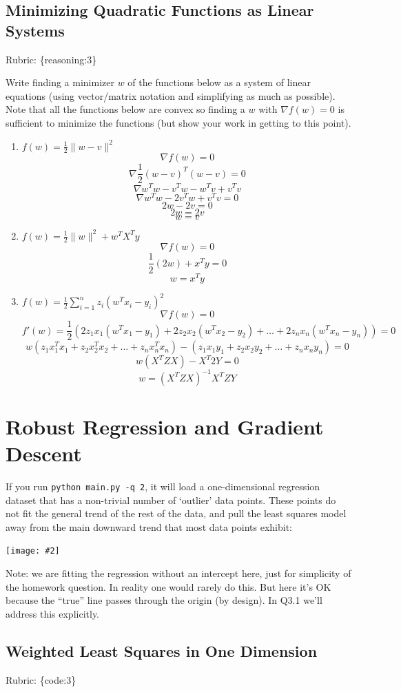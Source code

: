 \documentclass{article}
\def\rubric#1{\gre{Rubric: \{#1\}}}{}
\def\gre#1{{\color{gre}#1}}
\def\norm#1{\|#1\|}
\newcommand{\centerfig}[2]{\begin{center}\texttt{[image: \#2]}\end{center}}
\def\enum#1{\begin{enumerate}#1\end{enumerate}}
\begin{document}
\subsection{Minimizing Quadratic Functions as Linear Systems}
\rubric{reasoning:3}

Write finding a minimizer $w$ of the functions below as a system of linear equations (using vector/matrix notation and simplifying as much as possible). Note that all the functions below are convex  so finding a $w$ with $\nabla f(w) = 0$ is sufficient to minimize the functions (but show your work in getting to this point).
{\enum{
\item $f(w) = \frac{1}{2}\norm{w-v}^2$
$$\nabla f(w) = 0$$
$$\nabla \frac{1}{2}(w-v)^T(w-v) = 0$$
$$\nabla w^Tw - v^Tw - w^Tv + v^Tv$$
$$\nabla w^Tw - 2v^Tw + v^Tv = 0$$
$$2w - 2v = 0$$
$$2w = 2v$$
$$w = v$$
\item $f(w) = \frac{1}{2}\norm{w}^2 + w^TX^Ty$
$$\nabla f(w) = 0$$
$$\frac{1}{2}(2w) + x^Ty = 0$$
$$w = x^Ty$$
\item $f(w) = \frac{1}{2}\sum_{i=1}^n z_i (w^Tx_i - y_i)^2$
$$\nabla f(w) = 0$$
$$f'(w) = \frac{1}{2}(2z_1x_1(w^Tx_1 - y_1) + 2z_2x_2(w^Tx_2 - y_2) + \ldots + 2z_nx_n(w^Tx_n - y_n)) = 0$$
$$w(z_1x_1^Tx_1 + z_2x_2^Tx_2 + \ldots + z_nx_n^Tx_n) - (z_1x_1y_1 + z_2x_2y_2 + \ldots + z_nx_ny_n) = 0$$
$$w(X^TZX) - X^T2Y = 0$$
$$w = (X^TZX)^{-1}X^TZY$$  
}}

\section{Robust Regression and Gradient Descent}

If you run \verb|python main.py -q 2|, it will load a one-dimensional regression
dataset that has a non-trivial number of `outlier' data points.
These points do not fit the general trend of the rest of the data,
and pull the least squares model away from the main downward trend that most data points exhibit:
\centerfig{.7}{../figs/least_squares_outliers.pdf}

Note: we are fitting the regression without an intercept here, just for simplicity of the homework question.
In reality one would rarely do this. But here it's OK because the ``true'' line 
passes through the origin (by design). In Q3.1 we'll address this explicitly.

\subsection{Weighted Least Squares in One Dimension}
\rubric{code:3}
\end{document}
